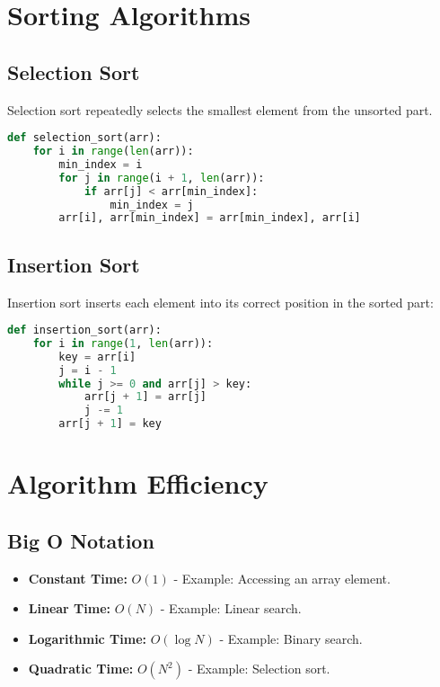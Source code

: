 \documentclass{article}
\begin{document}
\section{Sorting Algorithms}
\subsection{Selection Sort}
Selection sort repeatedly selects the smallest element from the unsorted part.
\begin{lstlisting}[language=Python]
def selection_sort(arr):
    for i in range(len(arr)):
        min_index = i
        for j in range(i + 1, len(arr)):
            if arr[j] < arr[min_index]:
                min_index = j
        arr[i], arr[min_index] = arr[min_index], arr[i]
\end{lstlisting}

\subsection{Insertion Sort}
Insertion sort inserts each element into its correct position in the sorted part:
\begin{lstlisting}[language=Python]
def insertion_sort(arr):
    for i in range(1, len(arr)):
        key = arr[i]
        j = i - 1
        while j >= 0 and arr[j] > key:
            arr[j + 1] = arr[j]
            j -= 1
        arr[j + 1] = key
\end{lstlisting}

\section{Algorithm Efficiency}
\subsection{Big O Notation}
\begin{itemize}
    \item \textbf{Constant Time:} \(O(1)\) - Example: Accessing an array element.
    \item \textbf{Linear Time:} \(O(N)\) - Example: Linear search.
    \item \textbf{Logarithmic Time:} \(O(\log N)\) - Example: Binary search.
    \item \textbf{Quadratic Time:} \(O(N^2)\) - Example: Selection sort.
\end{itemize}
\end{document}
